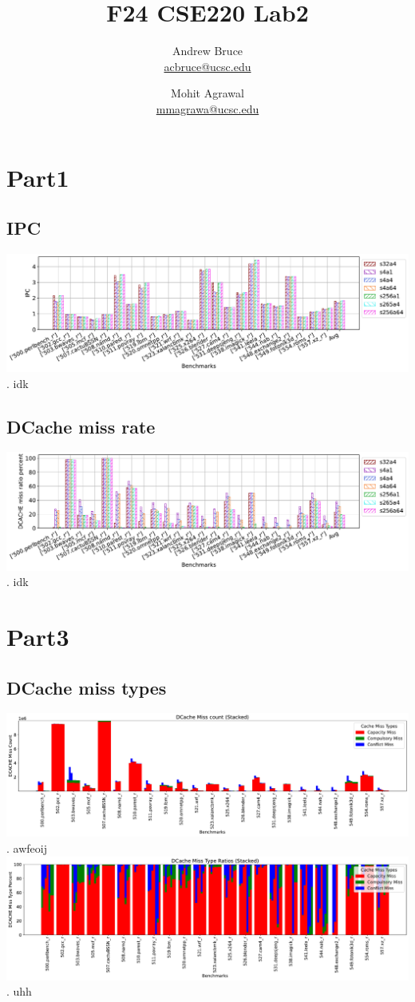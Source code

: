 \documentclass{article}
\title{F24 CSE220 Lab2}
\author{
  Andrew Bruce \\ \href{mailto:acbruce@ucsc.edu}{acbruce@ucsc.edu} \and
  Mohit Agrawal \\ \href{mailto:mmagrawa@ucsc.edu}{mmagrawa@ucsc.edu}
}
\begin{document}
\maketitle

\section*{Part1}
\subsection*{IPC}
\includegraphics[width=\textwidth]{Part1/IPC.pdf}.
idk
\subsection*{DCache miss rate}
\includegraphics[width=\textwidth]{Part1/DCACHE.pdf}.
idk
\section*{Part3}
\subsection*{DCache miss types}
\includegraphics[width=\textwidth]{Part3_4/DCACHE_MISS_STACKED.pdf}.
awfeoij\\
\includegraphics[width=\textwidth]{Part3_4/DCACHE_MISS_STACKED_RATIO.pdf}.
uhh
\end{document}

